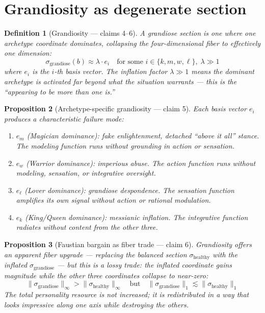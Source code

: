 \documentclass[11pt,a4paper]{article}
\newtheorem{definition}{Definition}[section]
\newtheorem{proposition}[definition]{Proposition}
\begin{document}
\section{Grandiosity as degenerate section}
\label{sec:grandiosity}

\begin{definition}[Grandiosity --- claims 4--6]
\label{def:grandiosity}
A \emph{grandiose section} is one where one archetype coordinate dominates,
collapsing the four-dimensional fiber to effectively one dimension:
\[
  \sigma_{\text{grandiose}}(b) \approx \lambda \cdot e_i
  \quad \text{for some } i \in \{k, m, w, \ell\},\; \lambda \gg 1
\]
where $e_i$ is the $i$-th basis vector. The inflation factor $\lambda \gg 1$
means the dominant archetype is activated far beyond what the situation
warrants --- this is the ``appearing to be more than one is.''
\end{definition}

\begin{proposition}[Archetype-specific grandiosity --- claim 5]
\label{prop:specific}
Each basis vector $e_i$ produces a characteristic failure mode:
\begin{enumerate}
\item $e_m$ (Magician dominance): fake enlightenment, detached ``above it all''
  stance. The modeling function runs without grounding in action or sensation.
\item $e_w$ (Warrior dominance): imperious abuse. The action function runs
  without modeling, sensation, or integrative oversight.
\item $e_\ell$ (Lover dominance): grandiose despondence. The sensation
  function amplifies its own signal without action or rational modulation.
\item $e_k$ (King/Queen dominance): messianic inflation. The integrative
  function radiates without content from the other three.
\end{enumerate}
\end{proposition}

\begin{proposition}[Faustian bargain as fiber trade --- claim 6]
\label{prop:faustian}
Grandiosity offers an apparent fiber upgrade --- replacing the balanced
section $\sigma_{\text{healthy}}$ with the inflated $\sigma_{\text{grandiose}}$
--- but this is a lossy trade: the inflated coordinate gains magnitude while
the other three coordinates collapse to near-zero:
\[
  \|\sigma_{\text{grandiose}}\|_\infty > \|\sigma_{\text{healthy}}\|_\infty
  \quad \text{but} \quad
  \|\sigma_{\text{grandiose}}\|_1 \lesssim \|\sigma_{\text{healthy}}\|_1
\]
The total personality resource is not increased; it is redistributed in a
way that looks impressive along one axis while destroying the others.
\end{proposition}
\end{document}
